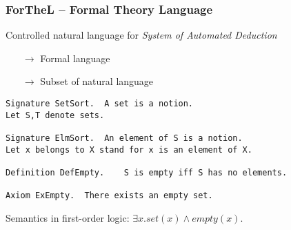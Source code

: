 \begin{frame}[fragile]
    \frametitle{ForTheL -- Formal Theory Language}
    Controlled natural language for \emph{System of Automated Deduction}
    \begin{itemize}
        \item[$\rightarrow$] Formal language
        \item[$\rightarrow$] Subset of natural language
    \end{itemize}

    \vspace{0.5em}
    \color{nlfg}
    \begin{lstlisting}[language=ftl]
Signature SetSort.  A set is a notion.
Let S,T denote sets.

Signature ElmSort.  An element of S is a notion.
Let x belongs to X stand for x is an element of X.

Definition DefEmpty.    S is empty iff S has no elements.

Axiom ExEmpty.  There exists an empty set.
    \end{lstlisting}
    \color{black}

    \pause
    \vspace{0.5em}
    Semantics in first-order logic: \color{logicfg}$\exists x.set(x) \wedge empty(x)$.
\end{frame}
